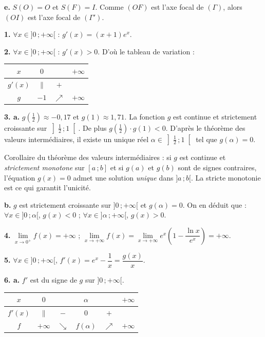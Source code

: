 \documentclass[11pt]{article}
\begin{document}
\textbf{e.} $S(O) = O$ et $S(F) = I$. Comme $(OF)$ est l'axe focal de $(\Gamma)$, alors $(OI)$ est l'axe focal de $(\Gamma')$.


\textbf{1.} $\forall x \in ]0\,;+\infty[$ : $g'(x) = (x + 1)e^x$.

\textbf{2.} $\forall x \in ]0\,;+\infty[$ : $g'(x) > 0$. D'où le tableau de variation :
\begin{center}\renewcommand{\arraystretch}{1.4}
\begin{tabular}{|c|ccc|}
\hline
$x$ & $0$ & & $+\infty$ \\
\hline
$g'(x)$ & $\|$ & $+$ & \\
\hline
$g$ & $-1$ & $\nearrow$ & $+\infty$ \\
\hline
\end{tabular}
\end{center}

\textbf{3. a.} $g\!\left(\tfrac{1}{2}\right) \approx -0{,}17$ et $g(1) \approx 1{,}71$. La fonction $g$ est continue et strictement croissante sur $\left]\tfrac{1}{2}\,;1\right[$. De plus $g\!\left(\tfrac{1}{2}\right) \cdot g(1) < 0$. D'après le théorème des valeurs intermédiaires, il existe un unique réel $\alpha \in \left]\tfrac{1}{2}\,;1\right[$ tel que $g(\alpha) = 0$.

\begin{rappel}
Corollaire du théorème des valeurs intermédiaires : si $g$ est continue
et \emph{strictement monotone} sur $[a\,;b]$ et si $g(a)$ et $g(b)$
sont de signes contraires, l'équation $g(x) = 0$ admet une solution
\emph{unique} dans $]a\,;b[$. La stricte monotonie est ce qui garantit
l'unicité.
\end{rappel}

\textbf{b.} $g$ est strictement croissante sur $]0\,;+\infty[$ et $g(\alpha) = 0$. On en déduit que : $\forall x \in ]0\,;\alpha[$, $g(x) < 0$ ; $\forall x \in ]\alpha\,;+\infty[$, $g(x) > 0$.

\textbf{4.} $\lim\limits_{x\to 0^+} f(x) = +\infty$ ; $\lim\limits_{x\to+\infty} f(x) = \lim\limits_{x\to+\infty} e^x\left(1 - \dfrac{\ln x}{e^x}\right) = +\infty$.

\textbf{5.} $\forall x \in ]0\,;+\infty[$, $f'(x) = e^x - \dfrac{1}{x} = \dfrac{g(x)}{x}$.

\textbf{6. a.} $f'$ est du signe de $g$ sur $]0\,;+\infty[$.
\begin{center}\renewcommand{\arraystretch}{1.4}
\begin{tabular}{|c|ccccc|}
\hline
$x$ & $0$ & & $\alpha$ & & $+\infty$ \\
\hline
$f'(x)$ & $\|$ & $-$ & $0$ & $+$ & \\
\hline
$f$ & $+\infty$ & $\searrow$ & $f(\alpha)$ & $\nearrow$ & $+\infty$ \\
\hline
\end{tabular}
\end{center}
\end{document}
